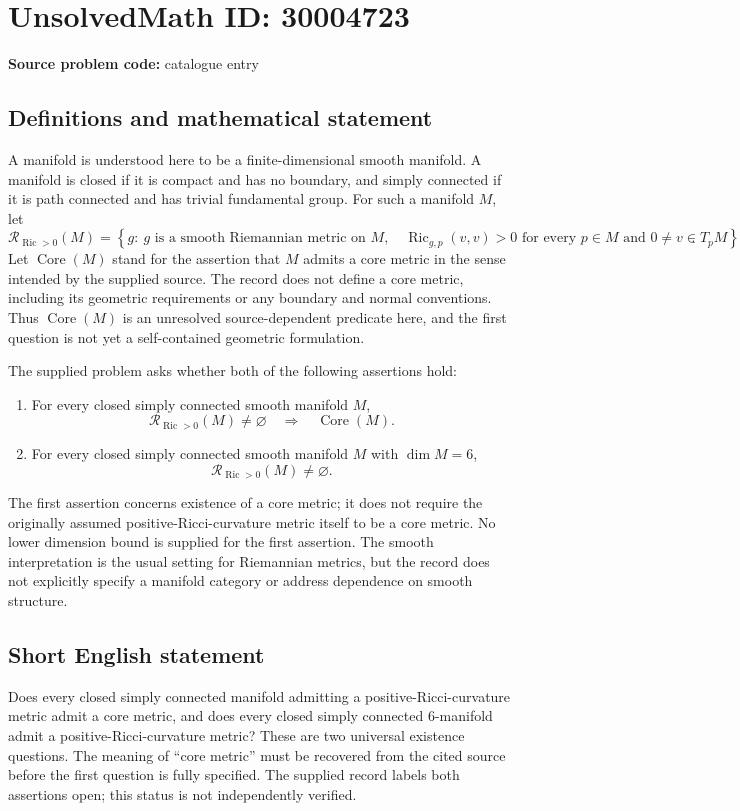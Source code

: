 \documentclass[11pt]{article}
\begin{document}
\section*{UnsolvedMath ID: 30004723}
\textbf{Source problem code:} catalogue entry
\subsection{Definitions and mathematical statement}
A manifold is understood here to be a finite-dimensional smooth manifold. A manifold is closed if it is compact and has no boundary, and simply connected if it is path connected and has trivial fundamental group. For such a manifold \(M\), let
\[
\mathcal R_{\operatorname{Ric}>0}(M)
=
\left\{g:\ g\text{ is a smooth Riemannian metric on }M,\quad
\operatorname{Ric}_{g,p}(v,v)>0\text{ for every }p\in M\text{ and }0\ne v\in T_pM\right\}.
\]
Let \(\operatorname{Core}(M)\) stand for the assertion that \(M\) admits a core metric in the sense intended by the supplied source. The record does not define a core metric, including its geometric requirements or any boundary and normal conventions. Thus \(\operatorname{Core}(M)\) is an unresolved source-dependent predicate here, and the first question is not yet a self-contained geometric formulation.

The supplied problem asks whether both of the following assertions hold:
\begin{enumerate}
\item For every closed simply connected smooth manifold \(M\),
\[
\mathcal R_{\operatorname{Ric}>0}(M)\ne\varnothing
\quad\Longrightarrow\quad
\operatorname{Core}(M).
\]
\item For every closed simply connected smooth manifold \(M\) with \(\dim M=6\),
\[
\mathcal R_{\operatorname{Ric}>0}(M)\ne\varnothing.
\]
\end{enumerate}
The first assertion concerns existence of a core metric; it does not require the originally assumed positive-Ricci-curvature metric itself to be a core metric. No lower dimension bound is supplied for the first assertion. The smooth interpretation is the usual setting for Riemannian metrics, but the record does not explicitly specify a manifold category or address dependence on smooth structure.
\subsection{Short English statement}
Does every closed simply connected manifold admitting a positive-Ricci-curvature metric admit a core metric, and does every closed simply connected 6-manifold admit a positive-Ricci-curvature metric? These are two universal existence questions. The meaning of ``core metric'' must be recovered from the cited source before the first question is fully specified. The supplied record labels both assertions open; this status is not independently verified.
\end{document}
